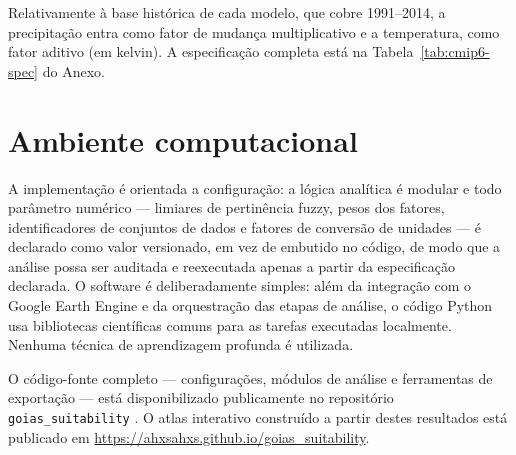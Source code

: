 Relativamente à base histórica de cada modelo, que cobre 1991--2014, a precipitação entra como fator de
mudança multiplicativo e a temperatura, como fator aditivo (em kelvin). A especificação completa está na
Tabela~\ref{tab:cmip6-spec} do Anexo.


\section{Ambiente computacional}

A implementação é orientada a configuração: a lógica analítica é modular e todo parâmetro numérico ---
limiares de pertinência fuzzy, pesos dos fatores, identificadores de conjuntos de dados e fatores de
conversão de unidades --- é declarado como valor versionado, em vez de embutido no código, de modo que a
análise possa ser auditada e reexecutada apenas a partir da especificação declarada. O software é
deliberadamente simples: além da integração com o Google Earth Engine e da orquestração das etapas de
análise, o código Python usa bibliotecas científicas comuns para as tarefas executadas
localmente. Nenhuma técnica de aprendizagem profunda é utilizada.

O código-fonte completo --- configurações, módulos de análise e ferramentas de exportação
--- está disponibilizado publicamente no repositório \texttt{goias\_suitability}
\citep{da_silva_goias_suitability_2026}. O atlas interativo construído a partir destes resultados está publicado em
\url{https://ahxsahxs.github.io/goias_suitability}.